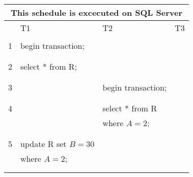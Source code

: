 \documentclass[addpoints,answers,12pt]{exam}
\begin{document}
\begin{questions}
\begin{parts}
\begin{subparts}
\hspace{-3cm}
\begin{tabular}{|c|l|l|l|} \hline
 \multicolumn{4}{c|}{This schedule is excecuted on {\bf SQL Server}} \\ \hline
   & \parbox{0.32\textwidth}{T1} & \parbox{0.32\textwidth}{T2} & \parbox{0.32\textwidth}{T3} \\ \hline
  &                                 &                    & \\
1 & begin transaction;              &                    & \\
  &                                 &                    & \\ \hline
  &                                 &                    & \\
2 & select * from R;                &                    & \\
  &                                 &                    & \\ \hline
  &                                 &                    & \\
3 &                                 & begin transaction; & \\
  &                                 &                    & \\ \hline
  &                                 &                    & \\
4 &                                 & select * from R    & \\
  &                                 & where $A=2$;       & \\
  &                                 &                    & \\ \hline
  &                                 &                    & \\
5 & update R set $B=30$             &                    & \\
  & where $A=2$;                    &                    & \\
  &                                 &                    & \\ \hline
  &                                 &                    & \\

\end{tabular}
\end{subparts}
\end{parts}
\end{questions}
\end{document}
